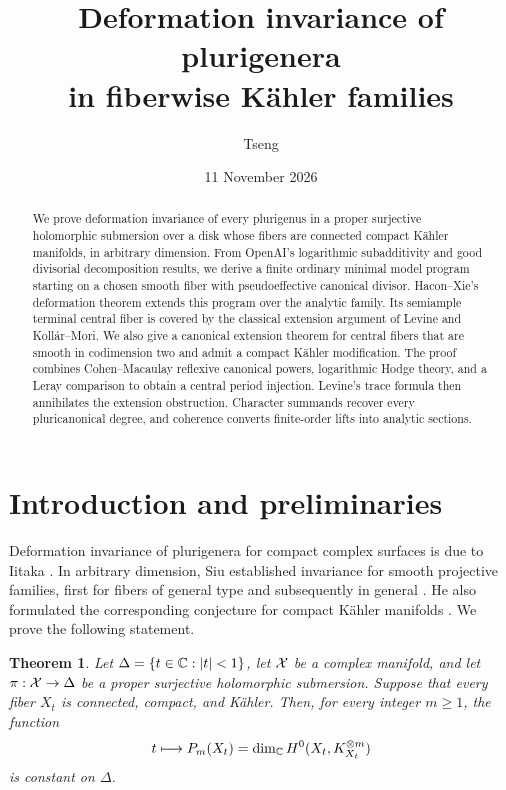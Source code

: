 \documentclass[11pt,a4paper]{article}
\title{Deformation invariance of plurigenera\\in fiberwise Kähler families}
\author{Tseng}
\date{11 November 2026}
\newtheorem{theorem}{Theorem}[section]
\theoremstyle{definition}\newtheorem{definition}[theorem]{Definition}
\theoremstyle{remark}\newtheorem*{remark}{Remark}
\begin{document}
\maketitle
\begin{abstract}
We prove deformation invariance of every plurigenus in a proper
surjective holomorphic submersion over a disk whose fibers are connected
compact Kähler manifolds, in arbitrary dimension. From OpenAI's
logarithmic subadditivity and good divisorial decomposition results,
we derive a finite
ordinary minimal model program starting on a chosen smooth fiber with
pseudoeffective canonical divisor. Hacon--Xie's deformation theorem
extends this program over the analytic family. Its semiample terminal
central fiber is covered by the classical extension argument of Levine
and Kollár--Mori. We also give a canonical extension theorem for
central fibers that are smooth in codimension two and admit
a compact Kähler modification. The proof combines Cohen--Macaulay
reflexive canonical powers, logarithmic Hodge theory, and a Leray
comparison to obtain a central period injection. Levine's trace formula
then annihilates the extension obstruction. Character summands recover
every pluricanonical degree, and coherence converts finite-order lifts
into analytic sections.
\end{abstract}
\tableofcontents
\section{Introduction and preliminaries}

Deformation invariance of plurigenera for compact complex surfaces is
due to Iitaka \cite[Theorem~III]{Iitaka1970}. In arbitrary dimension,
Siu established invariance for smooth projective families, first for
fibers of general type \cite[Main Theorem, p.~661]{Siu1998} and subsequently in general
\cite[Corollary~0.3]{Siu2002}. He also formulated the corresponding
conjecture for compact Kähler manifolds
\cite[Conjecture~0.4]{Siu2002}. We prove the following statement.

\begin{theorem}\label{thm:main}
Let $\Delta=\{t\in\mathbb C:|t|<1\}$, let $\mathcal X$ be a complex manifold, and let
$\pi:\mathcal X\to\Delta$ be a proper surjective holomorphic submersion.
Suppose that every fiber $X_t$ is connected, compact, and Kähler.
Then, for every integer $m\ge1$, the function
\[
 t\longmapsto P_m(X_t)
 =\dim_\mathbb C H^0(X_t,K_{X_t}^{\otimes m})
\]
is constant on $\Delta$.
\end{theorem}
\end{document}
